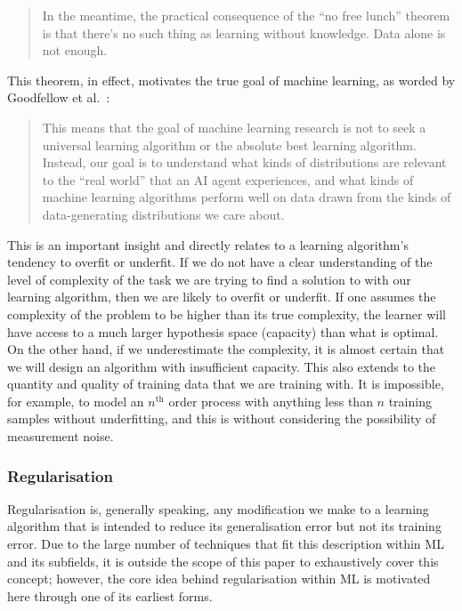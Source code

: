 \begin{quote}
    In the meantime, the practical consequence of the “no free lunch” theorem is that there’s no such thing as learning without knowledge. Data alone is not enough.
\end{quote}

This theorem, in effect, motivates the true goal of machine learning, as worded by Goodfellow et al.~\cite[p.~116]{Goodfellow-et-al-2016}:

\begin{quote}
    This means that the goal of machine learning research is not to seek a universal learning algorithm or the absolute best learning algorithm. Instead, our goal is to understand what kinds of distributions are relevant to the “real world” that an AI agent experiences, and what kinds of machine learning algorithms perform well on data drawn from the kinds of data-generating distributions we care about.
\end{quote}

This is an important insight and directly relates to a learning algorithm's tendency to overfit or underfit. If we do not have a clear understanding of the level of complexity of the task we are trying to find a solution to with our learning algorithm, then we are likely to overfit or underfit. If one assumes the complexity of the problem to be higher than its true complexity, the learner will have access to a much larger hypothesis space (capacity) than what is optimal. On the other hand, if we underestimate the complexity, it is almost certain that we will design an algorithm with insufficient capacity. This also extends to the quantity and quality of training data that we are training with. It is impossible, for example, to model an $n^\text{th}$ order process with anything less than $n$ training samples without underfitting, and this is without considering the possibility of measurement noise.

\subsubsection{Regularisation}
Regularisation is, generally speaking, any modification we make to a learning algorithm that is intended to reduce its generalisation error but not its training error. Due to the large number of techniques that fit this description within \gls{ML} and its subfields, it is outside the scope of this paper to exhaustively cover this concept; however, the core idea behind regularisation within \gls{ML} is motivated here through one of its earliest forms.

